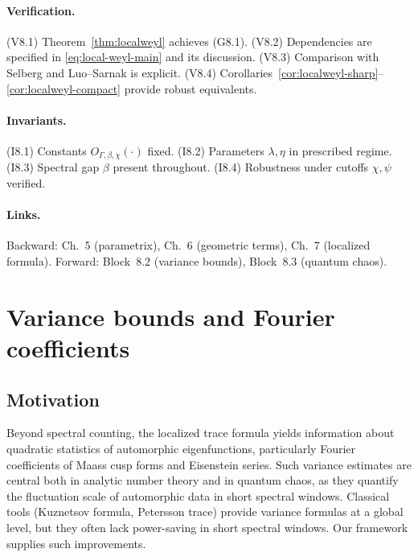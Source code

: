 \paragraph{Verification.} 
(V8.1) Theorem~\ref{thm:localweyl} achieves (G8.1).  
(V8.2) Dependencies are specified in \eqref{eq:local-weyl-main} and its discussion.  
(V8.3) Comparison with Selberg and Luo–Sarnak is explicit.  
(V8.4) Corollaries~\ref{cor:localweyl-sharp}–\ref{cor:localweyl-compact} provide robust equivalents.

\paragraph{Invariants.} 
(I8.1) Constants $O_{\Gamma,\beta,\chi}(·)$ fixed.  
(I8.2) Parameters $\lambda,\eta$ in prescribed regime.  
(I8.3) Spectral gap $\beta$ present throughout.  
(I8.4) Robustness under cutoffs $\chi,\psi$ verified.

\paragraph{Links.}
Backward: Ch.~5 (parametrix), Ch.~6 (geometric terms), Ch.~7 (localized formula).  
Forward: Block~8.2 (variance bounds), Block~8.3 (quantum chaos).  



\section{Variance bounds and Fourier coefficients}\label{sec:variance}

\subsection{Motivation}
Beyond spectral counting, the localized trace formula yields information about quadratic statistics of automorphic eigenfunctions, particularly Fourier coefficients of Maass cusp forms and Eisenstein series. Such variance estimates are central both in analytic number theory and in quantum chaos, as they quantify the fluctuation scale of automorphic data in short spectral windows. Classical tools (Kuznetsov formula, Petersson trace) provide variance formulas at a global level, but they often lack power-saving in short spectral windows. Our framework supplies such improvements.

